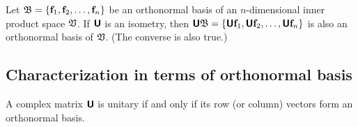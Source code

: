 Let ${\frak B}=\{{\bf f}_1,  {\bf f}_2, \ldots , {\bf f}_n\}$
be an orthonormal basis of an $n$-dimensional inner product space ${\frak V}$.
If
$\textsf{\textbf{U}}$ is an isometry, then
 $\textsf{\textbf{U}}{\frak B}=\{\textsf{\textbf{U}}{\bf f}_1, \textsf{\textbf{U}} {\bf f}_2,
\ldots ,\textsf{\textbf{U}} {\bf f}_n\}$
is also an orthonormal basis of  ${\frak V}$.
(The converse is also true.)

\subsection {Characterization in terms of orthonormal basis}
\label{2012-m-ch-citoob}


A complex matrix $\textsf{\textbf{U}}$ is unitary if and only if its row (or column) vectors form
an orthonormal basis.

